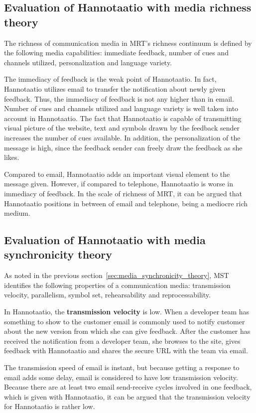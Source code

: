 \documentclass[english,12pt,a4paper,pdftex]{article}
\begin{document}
\subsection{Evaluation of Hannotaatio with media richness theory}

The richness of communication media in \ac{MRT}'s richness continuum is defined by the following media capabilities: immediate feedback, number of cues and channels utilized, personalization and language variety.

The immediacy of feedback is the weak point of Hannotaatio. In fact, Hannotaatio utilizes email to transfer the notification about newly given feedback. Thus, the immediacy of feedback is not any higher than in email. Number of cues and channels utilized and language variety is well taken into account in Hannotaatio. The fact that Hannotaatio is capable of transmitting visual picture of the website, text and symbols drawn by the feedback sender increases the number of cues available. In addition, the personalization of the message is high, since the feedback sender can freely draw the feedback as she likes.

Compared to email, Hannotaatio adds an important visual element to the message given. However, if compared to telephone, Hannotaatio is worse in immediacy of feedback. In the scale of richness of \ac{MRT}, it can be argued that Hannotaatio positions in between of email and telephone, being a mediocre rich medium.

\subsection{Evaluation of Hannotaatio with media synchronicity theory}

As noted in the previous section~\ref{sec:media_synchronicity_theory}, \ac{MST} identifies the following properties of a communication media: transmission velocity, parallelism, symbol set, rehearsability and reprocessability.

In Hannotaatio, the \textbf{transmission velocity} is low. When a developer team has something to show to the customer email is commonly used to notify customer about the new version from which she can give feedback. After the customer has received the notification from a developer team, she browses to the site, gives feedback with Hannotaatio and shares the secure \ac{URL} with the team via email.

The transmission speed of email is instant, but because getting a response to email adds some delay, email is considered to have low transmission velocity. Because there are at least two email send-receive cycles involved in one feedback, which is given with Hannotaatio, it can be argued that the transmission velocity for Hannotaatio is rather low.
\end{document}
